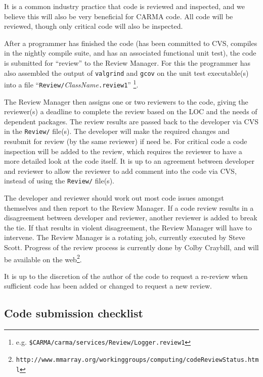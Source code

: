 \documentclass{article}
\begin{document}
It is a common industry practice that code is reviewed and inspected,
and we believe this will also be very beneficial for CARMA code.
All code will be reviewed, though only critical code will also be
inspected.

After a programmer has finished the code (has been committed to
CVS, compiles in the nightly compile suite, and has an associated
functional unit test), the code is submitted for ``review'' to
the Review Manager. For this the programmer has also assembled the output
of {\tt valgrind} and {\tt gcov} on the unit test executable(s)
into a file ``{\tt Review/}{\it ClassName}{\tt .review1}''
\footnote{e.g. {\tt \$CARMA/carma/services/Review/Logger.review1}}.

The Review Manager then assigns one or two reviewers
to the code, giving the reviewer(s) a deadline to complete the review based
on the LOC and the needs of dependent packages. The review results are
passed back to the developer via CVS in the {\tt Review/} file(s).  
The developer will make the required changes and resubmit for review (by the same
reviewer) if need be. For critical code a code inspection will be added to the
review, which requires the reviewer to have a more detailed look at the code
itself. It is up to an agreement between developer and reviewer to allow
the reviewer to add comment into the code via CVS, instead of using
the {\tt Review/} file(s).

The developer and reviewer should work out most code
issues amongst themselves and then report to the Review Manager.
If a code review results in a disagreement between
developer and reviewer, another reviewer is added to break the tie. If
that results in violent disagreement, the Review Manager will have
to intervene.  
The Review Manager is a rotating job, currently executed by Steve Scott.
Progress of the review process is currently done by Colby Craybill, and
will be available on the 
web\footnote{\tt http://www.mmarray.org/workinggroups/computing/codeReviewStatus.html}.

It is up to the discretion of the author of the code to request a re-review
when sufficient code has been added or changed to request a new review.

%

\newpage
\subsection{Code submission checklist}
\end{document}
